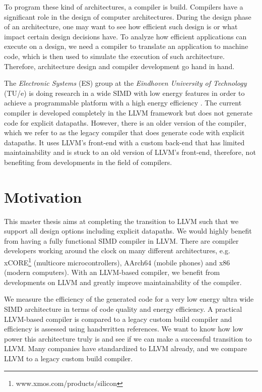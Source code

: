 To program these kind of architectures, a compiler is build. Compilers have a significant role in the design of computer architectures. During the design phase of an architecture, one may want to see how efficient such design is or what impact certain design decisions have. To analyze how efficient applications can execute on a design, we need a compiler to translate an application to machine code, which is then used to simulate the execution of such architecture. Therefore, architecture design and compiler development go hand in hand.  

The \emph{Electronic Systems} (ES) group at the \emph{Eindhoven University of Technology} (TU/e) is doing research in a wide SIMD with low energy features in order to achieve a programmable platform with a high energy efficiency \cite{dongrio1}. The current compiler is developed completely in the LLVM framework but does not generate code for explicit datapaths. However, there is an older version of the compiler, which we refer to as the legacy compiler that does generate code with explicit datapaths. It uses LLVM's front-end with a custom back-end that has limited maintainability and is stuck to an old version of LLVM's front-end, therefore, not benefiting from developments in the field of compilers.

\newpage \section{Motivation}
This master thesis aims at completing the transition to LLVM such that we support all design options including explicit datapaths. We would highly benefit from having a fully functional SIMD compiler in LLVM. There are compiler developers working around the clock on many different architectures, e.g. xCORE\footnote{www.xmos.com/products/silicon} (multicore microcontrollers), AArch64 (mobile phones) and x86 (modern computers). With an LLVM-based compiler, we benefit from developments on LLVM and greatly improve maintainability of the compiler.

We measure the efficiency of the generated code for a very low energy ultra wide SIMD architecture in terms of code quality and energy efficiency. A practical LLVM-based compiler is compared to a legacy custom build compiler and efficiency is assessed using handwritten references. We want to know how low power this architecture truly is and see if we can make a successful transition to LLVM. Many companies have standardized to LLVM already, and we compare LLVM to a legacy custom build compiler. %

